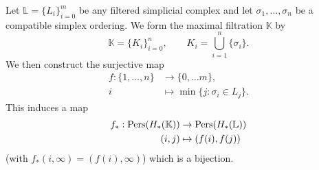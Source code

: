 Let $\mathbb L = \{L_i\}_{i=0}^m$ be any filtered simplicial complex and let $\sigma_1, \ldots, \sigma_n$ be a compatible simplex ordering. We form the maximal filtration $\mathbb K$ by
\[ \mathbb K = \{K_i\}_{i=0}^n, \qquad K_i = \bigcup_{i=1}^n \{\sigma_i\}. \]
We then construct the surjective map
\begin{align*}
  f: \{1, \ldots, n\} & \to \{0, \ldots m\},                 \\
  i                   & \mapsto \min\{j: \sigma_i \in L_j\}.
\end{align*}
This induces a map
\begin{align*}
  f_*: \operatorname{Pers}(H_*(\mathbb K)) & \to \operatorname{Pers}(H_*(\mathbb L)) \\
  (i, j)                     & \mapsto (f(i), f(j))
\end{align*}
(with $f_*(i, \infty) = (f(i), \infty)$) which is a bijection.




